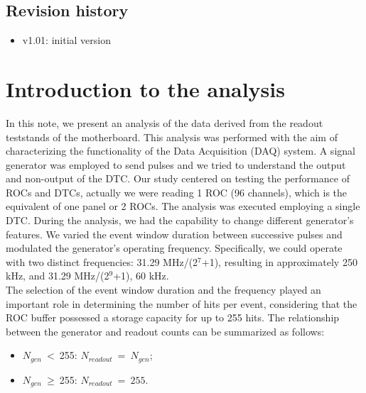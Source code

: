 \documentclass[12pt]{article}
\begin{document}
\subsection {Revision history} 
\begin{itemize}
\item
  v1.01: initial version
\end{itemize}

\section {Introduction to the analysis}

In this note, we present an analysis of the data derived from the readout teststands of the motherboard.
This analysis was performed with the aim of characterizing the functionality of the Data Acquisition (DAQ) system.
A signal generator was employed to send pulses and we tried to understand the output and non-output of the DTC. 
Our study centered on testing the performance of ROCs and DTCs, actually we were reading 1 ROC (96 channels), 
which is the equivalent of one panel or 2 ROCs. The analysis was executed employing a single DTC.
During the analysis, we had the capability to change different generator's features. We varied the event
window duration between successive pulses and modulated the generator's operating frequency. 
Specifically, we could operate with two distinct frequencies: 31.29 MHz/(2$^7$+1), resulting in approximately 250 kHz,
and 31.29 MHz/(2$^9$+1), 60 kHz. \\
The selection of the event window duration and the frequency played an important role in determining the number of hits per event,
considering that the ROC buffer possessed a storage capacity for up to 255 hits. The relationship between the generator 
and readout counts can be summarized as follows:
\begin{itemize}
    \item $N_{gen} \ < \ $255: $N_{readout} \ = \ N_{gen}$;
    \item $N_{gen} \ \geq \ $255: $N_{readout} \ = \ 255$.
\end{itemize}
\end{document}
